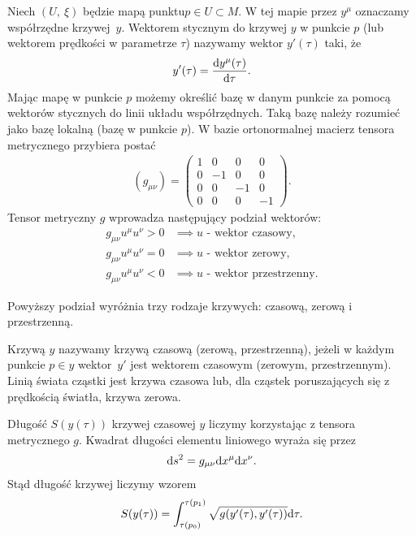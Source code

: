 \begin{definition}
Niech $(U,\ \xi)$ będzie mapą punktu$p\in U \subset M$. W tej mapie 
przez $y^\mu$ oznaczamy współrzędne krzywej~$y$.
Wektorem stycznym do krzywej $y$ w punkcie $p$  
(lub wektorem prędkości w 
parametrze $\tau$) nazywamy wektor $y'(\tau)$ taki, że
\begin{align*}
y' (\tau )= \frac{\text{d} y^\mu (\tau) }{\text{d} \tau}.
\end{align*}
Mając mapę w punkcie $p$ możemy określić bazę w danym punkcie
za pomocą wektorów stycznych do linii układu współrzędnych.
Taką bazę należy rozumieć jako bazę lokalną (bazę w punkcie $p$).
W bazie ortonormalnej macierz tensora metrycznego
przybiera postać 
\begin{align*}
( g_{\mu\nu} ) = \left(
\begin{array}{cccc}
1 & 0 & 0 & 0\\
0 & -1 & 0 & 0 \\
0 & 0 & -1 & 0 \\
0 & 0 & 0 & -1 
\end{array}
\right).
\end{align*}
Tensor metryczny $g$ wprowadza następujący podział wektorów:
\begin{align*}
g_{\mu\nu}u^\mu u^\nu > 0& \implies u \text{ - wektor czasowy,}\\
g_{\mu\nu}u^\mu u^\nu = 0& \implies u \text{ - wektor zerowy,}\\
g_{\mu\nu}u^\mu u^\nu < 0& \implies u \text{ - wektor przestrzenny.}
\end{align*}
\end{definition}
Powyższy podział wyróżnia trzy rodzaje krzywych: czasową, 
zerową i przestrzenną.
\begin{definition}
Krzywą $y$ nazywamy krzywą czasową (zerową, przestrzenną),
jeżeli w każdym punkcie $p \in y$ wektor~$y'$ jest 
wektorem czasowym
(zerowym, przestrzennym). Linią świata cząstki
jest krzywa czasowa lub, dla cząstek 
poruszających się z prędkością światła, 
krzywa zerowa.
\end{definition}
Długość $S(y(\tau))$ krzywej czasowej $y$ liczymy 
korzystając z tensora metrycznego $g$. 
Kwadrat długości elementu liniowego wyraża się przez
\begin{align*}
\text{d} s^2 = g_{\mu\nu} \text{d} x^\mu \text{d} x^\nu.
\end{align*}
Stąd długość krzywej liczymy wzorem
\begin{align}\label{dlugosc_krzywej}
S( y(\tau) ) = \int_{\tau(p_0)}^{\tau(p_1)} \sqrt{g (
y' (\tau), y' (\tau) )} \text{d} \tau.
\end{align}
